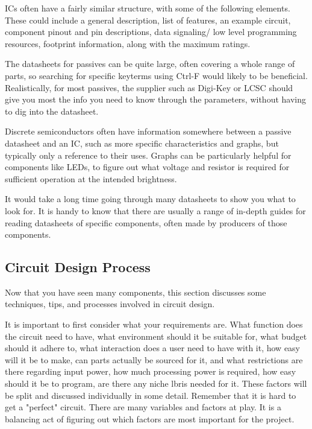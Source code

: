 \documentclass[a4paper,11pt]{report}
\begin{document}
ICs often have a fairly similar structure, with some of the following elements. These could include a general description, list of features, an example circuit, component pinout and pin descriptions, data signaling/ low level programming resources, footprint information, along with the maximum ratings.

The datasheets for passives can be quite large, often covering a whole range of parts, so searching for specific keyterms using Ctrl-F would likely to be beneficial. Realistically, for most passives, the supplier such as Digi-Key or LCSC should give you most the info you need to know through the parameters, without having to dig into the datasheet.

Discrete semiconductors often have information somewhere between a passive datasheet and an IC, such as more specific characteristics and graphs, but typically only a reference to their uses. Graphs can be particularly helpful for components like LEDs, to figure out what voltage and resistor is required for sufficient operation at the intended brightness.

It would take a long time going through many datasheets to show you what to look for. It is handy to know that there are usually a range of in-depth guides for reading datasheets of specific components, often made by producers of those components.

\vspace*{1\baselineskip}

\subsection{Circuit Design Process}

Now that you have seen many components, this section discusses some techniques, tips, and processes involved in circuit design.

It is important to first consider what your requirements are. What function does the circuit need to have, what environment should it be suitable for, what budget should it adhere to, what interaction does a user need to have with it, how easy will it be to make, can parts actually be sourced for it, and what restrictions are there regarding input power, how much processing power is required, how easy should it be to program, are there any niche \gls{lbris} needed for it. These factors will be split and discussed individually in some detail. Remember that it is hard to get a "perfect" circuit. There are many variables and factors at play. It is a balancing act of figuring out which factors are most important for the project.
\end{document}
